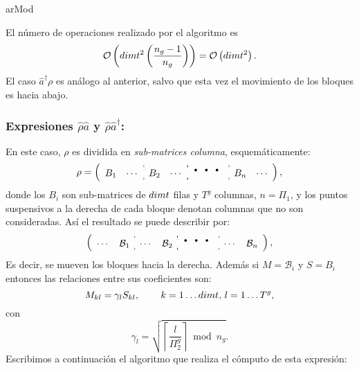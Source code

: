 \begin{algorithm}[H]
\caption{arMod}\label{algo:arMod}
\LinesNumbered
{}
\end{algorithm}
\quad El n\'umero de operaciones realizado por el algoritmo es $$\mathcal{O}\left(dimt^2\left(\frac{n_g-1}{n_g}\right)\right)=\mathcal{O}\left(dimt^2\right).$$ El caso $\hat{a}^{\dag}{\rho}$ es an\'alogo al anterior, salvo que esta vez el movimiento de los bloques es hacia abajo.
\subsubsection*{Expresiones $\hat{\rho}\hat{a}$ y $\hat{\rho}\hat{a}^{\dag}$: } \quad En este caso, $\rho$ es dividida en \emph{sub-matrices columna}, esquem\'aticamente:\begin{equation}\rho=\left(
\begin{array}{cc:cc:cc:cc}
 B_1&\cdots & B_2 & \cdots& \multicolumn{2}{:c:}{\mbox{\Huge$\cdots$}} &B_n&\cdots
\end{array}\right),\label{ec:esquema_rhoa}
\end{equation}
donde los $B_i$ son sub-matrices de $dimt$ filas y $T^g$ columnas, $n=\Pi_1$, y los puntos suspensivos a la derecha de cada bloque denotan columnas que no son consideradas. As\'i el resultado se puede describir por:\begin{equation}\left(
\begin{array}{cc:cc:cc:cc}
 \cdots&\mathcal{B}_1 & \cdots & \mathcal{B}_2& \multicolumn{2}{:c:}{\mbox{\Huge$\cdots$}} &\cdots&\mathcal{B}_n
\end{array}\right),
\end{equation}
\quad Es decir, se mueven los bloques hacia la derecha. Adem\'as si $M=\mathcal{B}_{i}$ y $S=B_{i}$ entonces las relaciones entre sus coeficientes son:\begin{equation}
M_{kl}=\gamma_{l}S_{kl},\,\qquad k=1\ldots dimt,\,l=1\ldots T^g, \label{ec:bloque_raM}
\end{equation}
con\begin{equation}
 \gamma_{l}=\sqrt{\left\lceil \frac{l}{\Pi_2^g} \right\rceil\bmod n_g}.\label{ec:coef_gammas_raMod}
\end{equation}
\quad Escribimos a continuaci\'on el algoritmo que realiza el c\'omputo de esta expresi\'on:

